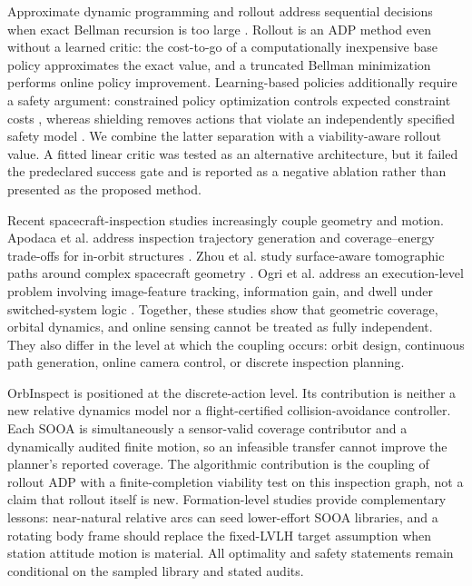 \documentclass{IEEEtaes}
\theoremstyle{remark}
\theoremstyle{plain}
\begin{document}
Approximate dynamic programming and rollout address sequential decisions when exact Bellman recursion is too large \cite{bertsekas2020rollout,bertsekas1996neuro}. Rollout is an ADP method even without a learned critic: the cost-to-go of a computationally inexpensive base policy approximates the exact value, and a truncated Bellman minimization performs online policy improvement. Learning-based policies additionally require a safety argument: constrained policy optimization controls expected constraint costs \cite{achiam2017cpo}, whereas shielding removes actions that violate an independently specified safety model \cite{alshiekh2018shielding}. We combine the latter separation with a viability-aware rollout value. A fitted linear critic was tested as an alternative architecture, but it failed the predeclared success gate and is reported as a negative ablation rather than presented as the proposed method.

Recent spacecraft-inspection studies increasingly couple geometry and motion. Apodaca et al. address inspection trajectory generation and coverage--energy trade-offs for in-orbit structures \cite{apodaca2025trajectory}. Zhou et al. study surface-aware tomographic paths around complex spacecraft geometry \cite{zhou2026tomographic}. Ogri et al. address an execution-level problem involving image-feature tracking, information gain, and dwell under switched-system logic \cite{ogri2025switched}. Together, these studies show that geometric coverage, orbital dynamics, and online sensing cannot be treated as fully independent. They also differ in the level at which the coupling occurs: orbit design, continuous path generation, online camera control, or discrete inspection planning.

OrbInspect is positioned at the discrete-action level. Its contribution is neither a new relative dynamics model nor a flight-certified collision-avoidance controller. Each SOOA is simultaneously a sensor-valid coverage contributor and a dynamically audited finite motion, so an infeasible transfer cannot improve the planner's reported coverage. The algorithmic contribution is the coupling of rollout ADP with a finite-completion viability test on this inspection graph, not a claim that rollout itself is new. Formation-level studies provide complementary lessons: near-natural relative arcs can seed lower-effort SOOA libraries, and a rotating body frame should replace the fixed-LVLH target assumption when station attitude motion is material. All optimality and safety statements remain conditional on the sampled library and stated audits.
\end{document}
